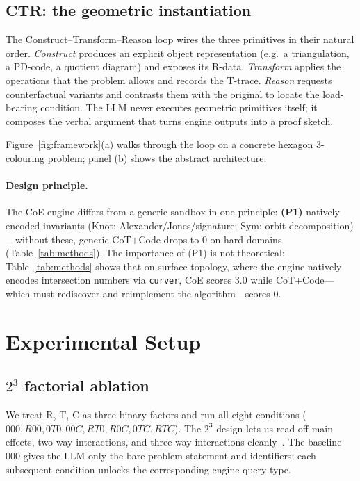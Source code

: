\documentclass{article}
\begin{document}
\subsection{CTR: the geometric instantiation}
\label{sec:ctr}
The Construct--Transform--Reason loop wires the three primitives in their natural order.
\emph{Construct} produces an explicit object representation (e.g.~a triangulation,
a PD-code, a quotient diagram) and exposes its R-data. \emph{Transform} applies the
operations that the problem allows and records the T-trace. \emph{Reason} requests
counterfactual variants and contrasts them with the original to locate the
load-bearing condition. The LLM never executes geometric primitives itself; it composes
the verbal argument that turns engine outputs into a proof sketch.

Figure~\ref{fig:framework}(a) walks through the loop on a concrete hexagon
$3$-colouring problem; panel (b) shows the abstract architecture.

\paragraph{Design principle.}
The CoE engine differs from a generic sandbox in one principle: \textbf{(P1)}
natively encoded invariants (Knot: Alexander/Jones/signature; Sym: orbit
decomposition)---without these, generic CoT+Code drops to $0$ on hard
domains (Table~\ref{tab:methods}). The importance of (P1) is not theoretical:
Table~\ref{tab:methods} shows that on surface topology, where the engine
natively encodes intersection numbers via \texttt{curver}, CoE scores $3.0$
while CoT+Code---which must rediscover and reimplement the algorithm---scores
$0$.

\section{Experimental Setup}
\label{sec:exp}

\subsection{$2^3$ factorial ablation}
We treat R, T, C as three binary factors and run all eight conditions
($000, R00, 0T0, 00C, RT0, R0C, 0TC, RTC$). The $2^3$ design lets us read off main
effects, two-way interactions, and three-way interactions cleanly~\citep{montgomery2017doe}. The baseline
$000$ gives the LLM only the bare problem statement and identifiers; each subsequent
condition unlocks the corresponding engine query type.
\end{document}
